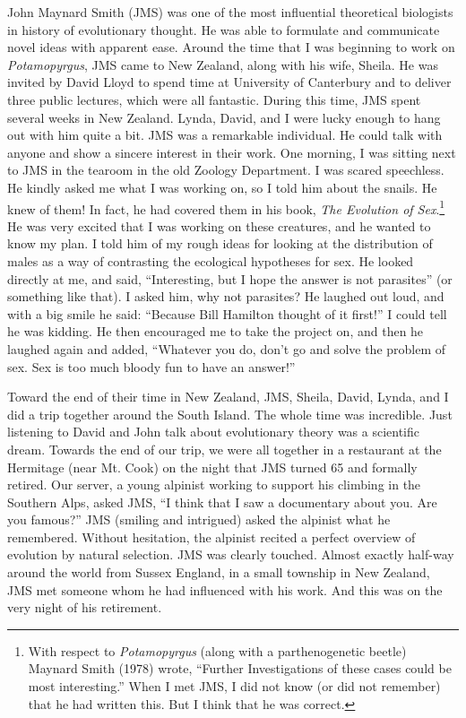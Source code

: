 \documentclass[
  letterpaper,
]{book}
\begin{document}
John Maynard Smith (JMS) was one of the most influential theoretical
biologists in history of evolutionary thought. He was able to formulate
and communicate novel ideas with apparent ease. Around the time that I
was beginning to work on \emph{Potamopyrgus}, JMS came to New Zealand,
along with his wife, Sheila. He was invited by David Lloyd to spend time
at University of Canterbury and to deliver three public lectures, which
were all fantastic. During this time, JMS spent several weeks in New
Zealand. Lynda, David, and I were lucky enough to hang out with him
quite a bit. JMS was a remarkable individual. He could talk with anyone
and show a sincere interest in their work. One morning, I was sitting
next to JMS in the tearoom in the old Zoology Department. I was scared
speechless. He kindly asked me what I was working on, so I told him
about the snails. He knew of them! In fact, he had covered them in his
book, \emph{The Evolution of Sex}.\footnote{With respect to
  \emph{Potamopyrgus} (along with a parthenogenetic beetle) Maynard
  Smith (1978) wrote, ``Further Investigations of these cases could be
  most interesting.'' When I met JMS, I did not know (or did not
  remember) that he had written this. But I think that he was correct.}
He was very excited that I was working on these creatures, and he wanted
to know my plan. I told him of my rough ideas for looking at the
distribution of males as a way of contrasting the ecological hypotheses
for sex. He looked directly at me, and said, ``Interesting, but I hope
the answer is not parasites'' (or something like that). I asked him, why
not parasites? He laughed out loud, and with a big smile he said:
``Because Bill Hamilton thought of it first!'' I could tell he was
kidding. He then encouraged me to take the project on, and then he
laughed again and added, ``Whatever you do, don't go and solve the
problem of sex. Sex is too much bloody fun to have an answer!''

Toward the end of their time in New Zealand, JMS, Sheila, David, Lynda,
and I did a trip together around the South Island. The whole time was
incredible. Just listening to David and John talk about evolutionary
theory was a scientific dream. Towards the end of our trip, we were all
together in a restaurant at the Hermitage (near Mt. Cook) on the night
that JMS turned 65 and formally retired. Our server, a young alpinist
working to support his climbing in the Southern Alps, asked JMS, ``I
think that I saw a documentary about you. Are you famous?'' JMS (smiling
and intrigued) asked the alpinist what he remembered. Without
hesitation, the alpinist recited a perfect overview of evolution by
natural selection. JMS was clearly touched. Almost exactly half-way
around the world from Sussex England, in a small township in New
Zealand, JMS met someone whom he had influenced with his work. And this
was on the very night of his retirement.
\end{document}
